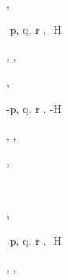 \documentclass[a4paper]{article}
\begin{document}
\begin{alectryon}
\begin{sentence}
\begin{input}
      ~~~~~
    \end{input}
    \sep
    \begin{output}
      \begin{goals}
        \begin{goal}
          \begin{hyps}
            \hyp{p, q, r}{}
            \sep
            \hyp{H}{~~}
          \end{hyps}
          \sep
          \infrule{}
          \sep
          \begin{conclusion}
          \end{conclusion}
        \end{goal}
        \sep
        \begin{extragoals}
          \begin{goal}
            \begin{hyps}
              \hyp{p, q, r}{}
              \sep
              \hyp{H}{~~}
            \end{hyps}
            \sep
            \infrule{}
            \sep
            \begin{conclusion}
            \end{conclusion}
          \end{goal}
        \end{extragoals}
      \end{goals}
    \end{output}
  \end{sentence}
  \sep
  \begin{sentence}
    \begin{input}
      ~~~~~~
    \end{input}
    \sep
    \begin{output}
      \begin{goals}
        \begin{goal}
          \begin{hyps}
            \hyp{p, q, r}{}
            \sep
            \hyp{H}{~~}
          \end{hyps}
          \sep
          \infrule{}
          \sep
          \begin{conclusion}
          \end{conclusion}

\end{goal}
\end{goals}
\end{output}
\end{sentence}
\end{alectryon}
\end{document}
